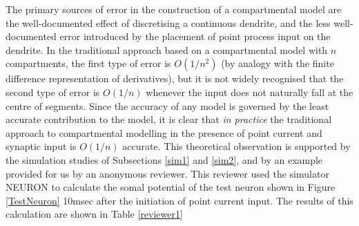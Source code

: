 The primary sources of error in the construction of a
compartmental model are the well-documented effect of discretising
a continuous dendrite, and the less well-documented error
introduced by the placement of point process input on the
dendrite. In the traditional approach based on a compartmental
model with $n$ compartments, the first type of error is $O(1/n^2)$
(by analogy with the finite difference representation of
derivatives), but it is not widely recognised that the second type
of error is $O(1/n)$ whenever the input does not naturally fall at
the centre of segments. Since the accuracy of any model is
governed by the least accurate contribution to the model, it is
clear that \emph{in practice} the traditional approach to
compartmental modelling in the presence of point current and
synaptic input is $O(1/n)$ accurate. This theoretical observation
is supported by the simulation studies of Subsections \ref{sim1}
and \ref{sim2}, and by an example provided for us by an anonymous
reviewer. This reviewer used the simulator NEURON to calculate the
somal potential of the test neuron shown in Figure
\ref{TestNeuron} 10msec after the initiation of point current
input. The results of this calculation are shown in Table
\ref{reviewer1}

